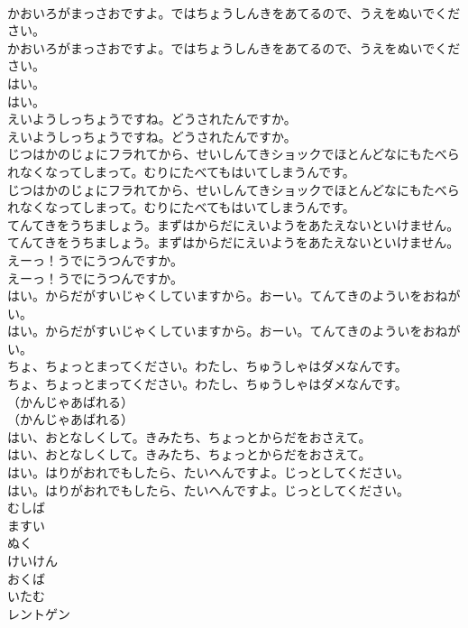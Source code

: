 \documentclass[8pt]{extreport}
\begin{document}
\begin{CJK}{UTF8}{min}
\\	かおいろがまっさおですよ。ではちょうしんきをあてるので、うえをぬいでください。	
\\	かおいろがまっさおですよ。ではちょうしんきをあてるので、うえをぬいでください。 
\\	はい。	
\\	はい。 
\\	えいようしっちょうですね。どうされたんですか。	
\\	えいようしっちょうですね。どうされたんですか。 
\\	じつはかのじょにフラれてから、せいしんてきショックでほとんどなにもたべられなくなってしまって。むりにたべてもはいてしまうんです。	
\\	じつはかのじょにフラれてから、せいしんてきショックでほとんどなにもたべられなくなってしまって。むりにたべてもはいてしまうんです。 
\\	てんてきをうちましょう。まずはからだにえいようをあたえないといけません。	
\\	てんてきをうちましょう。まずはからだにえいようをあたえないといけません。 
\\	えーっ！うでにうつんですか。	
\\	えーっ！うでにうつんですか。 
\\	はい。からだがすいじゃくしていますから。おーい。てんてきのよういをおねがい。	
\\	はい。からだがすいじゃくしていますから。おーい。てんてきのよういをおねがい。 
\\	ちょ、ちょっとまってください。わたし、ちゅうしゃはダメなんです。	
\\	ちょ、ちょっとまってください。わたし、ちゅうしゃはダメなんです。 
\\	（かんじゃあばれる）	
\\	（かんじゃあばれる） 
\\	はい、おとなしくして。きみたち、ちょっとからだをおさえて。	
\\	はい、おとなしくして。きみたち、ちょっとからだをおさえて。 
\\	はい。はりがおれでもしたら、たいへんですよ。じっとしてください。	
\\	はい。はりがおれでもしたら、たいへんですよ。じっとしてください。 
\\	むしば
\\	ますい
\\	ぬく
\\	けいけん
\\	おくば
\\	いたむ
\\	レントゲン

\end{CJK}
\end{document}

